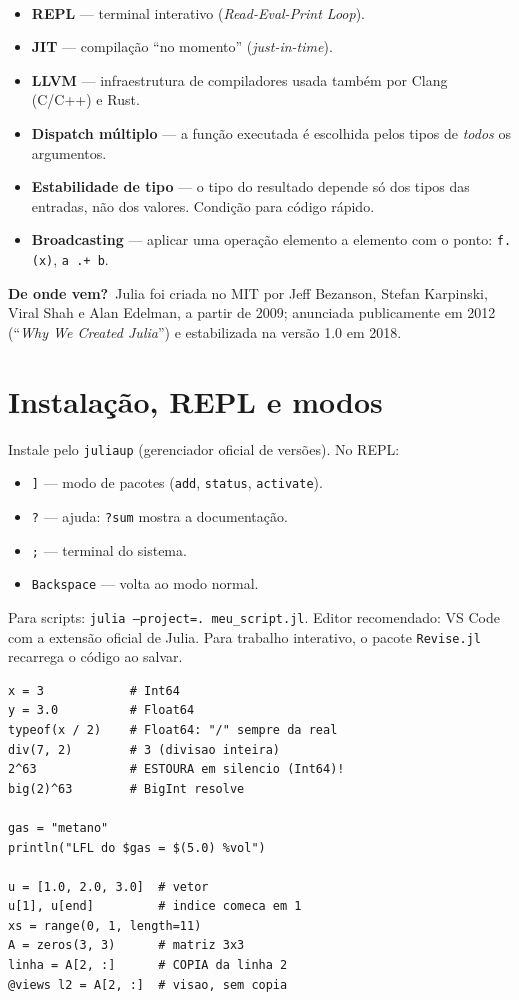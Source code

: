 \documentclass[10pt,a4paper,twocolumn,openany]{report}
\newcommand{\lead}[2]{\par\medskip\noindent{\color{#1}\bfseries #2}\ }
\newenvironment{conceito}[1]{\section{#1}}{\par}
\newenvironment{dicionario}[1][Dicionário da equação]{\lead{azul}{#1.}\small}{\par\medskip}
\newcommand{\origem}{\par\smallskip\noindent\textcolor{azul}{\textbf{De onde vem?}}\ }
\begin{document}
\begin{dicionario}[Vocabulário de Julia]
\begin{itemize}[leftmargin=*,nosep]
  \item \textbf{REPL} --- terminal interativo (\emph{Read-Eval-Print Loop}).
  \item \textbf{JIT} --- compilação ``no momento'' (\emph{just-in-time}).
  \item \textbf{LLVM} --- infraestrutura de compiladores usada também por
        Clang (C/C++) e Rust.
  \item \textbf{Dispatch múltiplo} --- a função executada é escolhida pelos
        tipos de \emph{todos} os argumentos.
  \item \textbf{Estabilidade de tipo} --- o tipo do resultado depende só dos
        tipos das entradas, não dos valores. Condição para código rápido.
  \item \textbf{Broadcasting} --- aplicar uma operação elemento a elemento
        com o ponto: \texttt{f.(x)}, \texttt{a .+ b}.
\end{itemize}
\origem Julia foi criada no MIT por Jeff Bezanson, Stefan Karpinski, Viral
Shah e Alan Edelman, a partir de 2009; anunciada publicamente em 2012
(``\emph{Why We Created Julia}'') e estabilizada na versão 1.0 em 2018.
\end{dicionario}

\begin{conceito}{Instalação, REPL e modos}
Instale pelo \texttt{juliaup} (gerenciador oficial de versões). No REPL:
\begin{itemize}[nosep]
  \item \texttt{]} --- modo de pacotes (\texttt{add}, \texttt{status}, \texttt{activate}).
  \item \texttt{?} --- ajuda: \texttt{?sum} mostra a documentação.
  \item \texttt{;} --- terminal do sistema.
  \item \texttt{Backspace} --- volta ao modo normal.
\end{itemize}
Para scripts: \texttt{julia --project=. meu\_script.jl}. Editor recomendado:
VS Code com a extensão oficial de Julia. Para trabalho interativo, o pacote
\texttt{Revise.jl} recarrega o código ao salvar.
\end{conceito}

\begin{lstlisting}[caption={Primeiros passos: tipos, strings e vetores}]
x = 3            # Int64
y = 3.0          # Float64
typeof(x / 2)    # Float64: "/" sempre da real
div(7, 2)        # 3 (divisao inteira)
2^63             # ESTOURA em silencio (Int64)!
big(2)^63        # BigInt resolve

gas = "metano"
println("LFL do $gas = $(5.0) %vol")

u = [1.0, 2.0, 3.0]  # vetor
u[1], u[end]         # indice comeca em 1
xs = range(0, 1, length=11)
A = zeros(3, 3)      # matriz 3x3
linha = A[2, :]      # COPIA da linha 2
@views l2 = A[2, :]  # visao, sem copia
\end{lstlisting}
\end{document}
